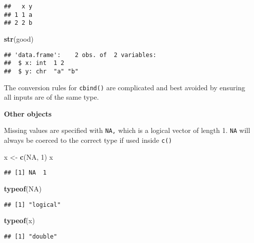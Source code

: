 \documentclass[
]{book}
\newenvironment{Shaded}{\begin{snugshade}}{\end{snugshade}}
\newcommand{\DecValTok}[1]{\textcolor[rgb]{0.00,0.00,0.81}{#1}}
\newcommand{\KeywordTok}[1]{\textcolor[rgb]{0.13,0.29,0.53}{\textbf{#1}}}
\newcommand{\NormalTok}[1]{#1}
\newcommand{\OtherTok}[1]{\textcolor[rgb]{0.56,0.35,0.01}{#1}}
\newcommand{\StringTok}[1]{\textcolor[rgb]{0.31,0.60,0.02}{#1}}
\begin{document}
\begin{verbatim}
##   x y
## 1 1 a
## 2 2 b
\end{verbatim}

\begin{Shaded}
\begin{Highlighting}[]
\KeywordTok{str}\NormalTok{(good)}
\end{Highlighting}
\end{Shaded}

\begin{verbatim}
## 'data.frame':    2 obs. of  2 variables:
##  $ x: int  1 2
##  $ y: chr  "a" "b"
\end{verbatim}

The conversion rules for \texttt{cbind()} are complicated and best avoided by ensuring all inputs are of the same type.

\textbf{Other objects}

Missing values are specified with \texttt{NA,} which is a logical vector of length 1. \texttt{NA} will always be coerced to the correct type if used inside \texttt{c()}

\begin{Shaded}
\begin{Highlighting}[]
\NormalTok{x \textless{}{-}}\StringTok{ }\KeywordTok{c}\NormalTok{(}\OtherTok{NA}\NormalTok{, }\DecValTok{1}\NormalTok{)}
\NormalTok{x}
\end{Highlighting}
\end{Shaded}

\begin{verbatim}
## [1] NA  1
\end{verbatim}

\begin{Shaded}
\begin{Highlighting}[]
\KeywordTok{typeof}\NormalTok{(}\OtherTok{NA}\NormalTok{)}
\end{Highlighting}
\end{Shaded}

\begin{verbatim}
## [1] "logical"
\end{verbatim}

\begin{Shaded}
\begin{Highlighting}[]
\KeywordTok{typeof}\NormalTok{(x)}
\end{Highlighting}
\end{Shaded}

\begin{verbatim}
## [1] "double"
\end{verbatim}
\end{document}
